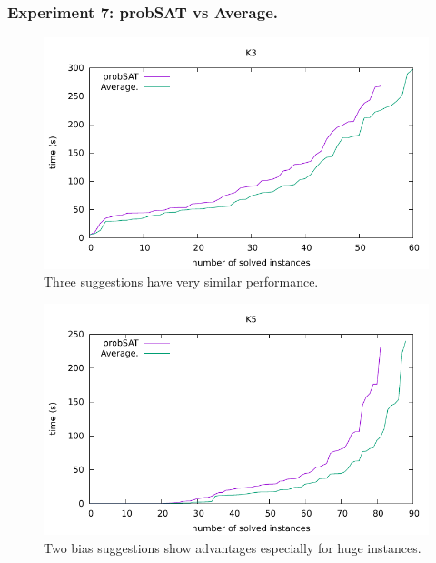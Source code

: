 \documentclass[12pt,a4paper,twoside]{scrartcl}
\numberwithin{equation}{section}
\begin{document}
\subsubsection{Experiment 7: probSAT vs Average.}  
\label{sec:Experiment 7} 
  \begin{figure}[H]
\begin{center}
  \includegraphics[scale = 1]{DATA/K3/e4a.pdf}
  \end{center}
  \caption{Three suggestions have very similar performance.}
  \label{Experiment 7 k3 cactus plot}
  \end{figure}
  \begin{figure}[H]
\begin{center}
  \includegraphics[scale = 1]{DATA/K5/e4a.pdf}
  \end{center}
  \caption{Two bias suggestions show advantages especially for huge instances.}
  \label{Experiment 7 k5 cactus plot}
  \end{figure}
\end{document}
